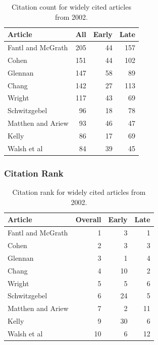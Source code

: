 \documentclass[
  10pt,
  letterpaper,
  DIV=11,
  numbers=noendperiod,
  twoside]{scrartcl}
\begin{document}
\begin{longtable}[]{@{}lrrr@{}}

\caption{\label{tbl-citation-count-2002}Citation count for widely cited
articles from 2002.}

\tabularnewline

\toprule\noalign{}
Article & All & Early & Late \\
\midrule\noalign{}
\endhead
\bottomrule\noalign{}
\endlastfoot
Fantl and McGrath & 205 & 44 & 157 \\
Cohen & 151 & 44 & 102 \\
Glennan & 147 & 58 & 89 \\
Chang & 142 & 27 & 113 \\
Wright & 117 & 43 & 69 \\
Schwitzgebel & 96 & 18 & 78 \\
Matthen and Ariew & 93 & 46 & 47 \\
Kelly & 86 & 17 & 69 \\
Walsh et al & 84 & 39 & 45 \\

\end{longtable}

\subsubsection*{Citation Rank}\label{sec-rank-2002}

\begin{longtable}[]{@{}lrrr@{}}

\caption{\label{tbl-citation-rank-2002}Citation rank for widely cited
articles from 2002.}

\tabularnewline

\toprule\noalign{}
Article & Overall & Early & Late \\
\midrule\noalign{}
\endhead
\bottomrule\noalign{}
\endlastfoot
Fantl and McGrath & 1 & 3 & 1 \\
Cohen & 2 & 3 & 3 \\
Glennan & 3 & 1 & 4 \\
Chang & 4 & 10 & 2 \\
Wright & 5 & 5 & 6 \\
Schwitzgebel & 6 & 24 & 5 \\
Matthen and Ariew & 7 & 2 & 11 \\
Kelly & 9 & 30 & 6 \\
Walsh et al & 10 & 6 & 12 \\

\end{longtable}
\end{document}
